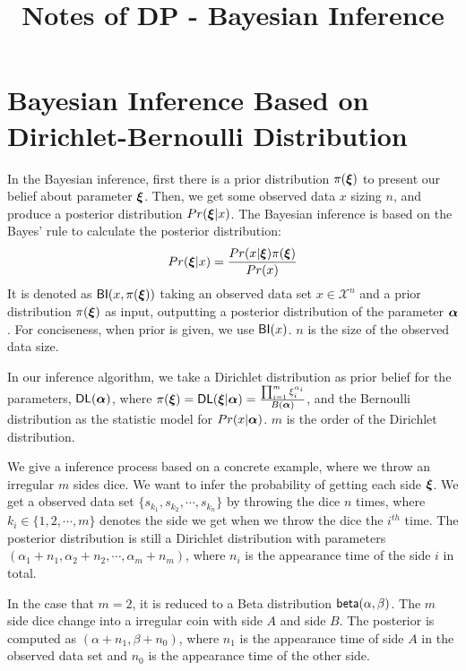 \documentclass[sigconf, anonymous]{acmart}
\title{\textbf{Notes of DP - Bayesian Inference}\\}
\date{\vspace{-10ex}}
\begin{document}
\maketitle

\section{Bayesian Inference Based on Dirichlet-Bernoulli Distribution}
\label{sec_bayesInfer}
In the Bayesian inference, first there is a prior distribution $\pi(\boldsymbol{\xi})$ to present our belief about parameter $\boldsymbol{\xi}$. Then, we get some observed data $x$ sizing $n$, and produce a posterior distribution $Pr(\boldsymbol{\xi} | x)$. The Bayesian inference is based on the Bayes' rule to calculate the posterior distribution:
\begin{equation*}
Pr(\boldsymbol{\xi} | x) = \frac{Pr(x | \boldsymbol{\xi}) \pi(\boldsymbol{\xi})}{Pr(x)}
\end{equation*}
It is denoted as $\mathsf{BI}(x,\pi(\boldsymbol{\xi}))$ taking an observed data set $x \in \mathcal{X}^n$ and a prior distribution $\pi(\boldsymbol{\xi})$ as input, outputting a posterior distribution of the parameter $\boldsymbol{\alpha}$. For conciseness, when prior is given, we use $\mathsf{BI}(x)$. $n$ is the size of the observed data size.

In our inference algorithm, we take a Dirichlet distribution as prior belief for the parameters, $\mathsf{DL}(\boldsymbol{\alpha})$, where $\pi(\boldsymbol{\xi}) = \mathsf{DL}(\boldsymbol{\xi} | \boldsymbol{\alpha}) = \frac{\prod_{i = 1}^{m}\xi_i^{\alpha_i}}{B(\boldsymbol{\alpha})}$, and the Bernoulli distribution as the statistic model for $Pr(x | \boldsymbol{\alpha})$. $m$ is the order of the Dirichlet distribution.

We give a inference process based on a concrete example, where we throw an irregular $m$ sides dice. We want to infer the probability of getting each side $\boldsymbol{\xi}$. We get a observed data set $\{s_{k_1}, s_{k_2}, \cdots, s_{k_n}\}$ by throwing the dice $n$ times, where $k_i \in \{1,2,\cdots, m\}$ denotes the side we get when we throw the dice the $i^{th}$ time. The posterior distribution is still a Dirichlet distribution with parameters $(\alpha_1 + n_1, \alpha_2 + n_2, \cdots, \alpha_m + n_m)$, where $n_i$ is the appearance time of the side $i$ in total.

In the case that $m = 2$, it is reduced to a Beta distribution $\mathsf{beta}(\alpha, \beta)$. The $m$ side dice change into a irregular coin with side $A$ and side $B$. The posterior is computed as $(\alpha + n_1, \beta + n_0)$, where $n_1$ is the appearance time of side $A$ in the observed data set and $n_0$ is the appearance time of the other side.
\end{document}
